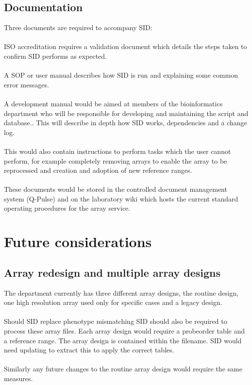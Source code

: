 \subsection{Documentation}
Three documents are required to accompany SID:
\paragraph*{}
ISO accreditation requires a validation document which details the steps taken to confirm SID performs as expected.
\paragraph*{}
A SOP or user manual describes how SID is run and explaining some common error messages.
\paragraph*{}
A development manual would be aimed at members of the bioinformatics department who will be responsible for developing and maintaining the script and database.. This will describe in depth how SID works, dependencies and a change log. 
\paragraph*{}
This would also contain instructions to perform tasks which the user cannot perform, for example completely removing arrays to enable the array to be reprocessed and creation and adoption of new reference ranges.
\paragraph*{}
These documents would be stored in the controlled document management system (Q-Pulse) and on the laboratory wiki which hosts the current standard operating procedures for the array service.

\section{Future considerations}
\subsection{Array redesign and multiple array designs}
The department currently has three different array designs, the routine design, one high resolution array used only for specific cases and a legacy design. 
\paragraph*{}
Should SID replace phenotype mismatching SID should also be required to process these array files. Each array design would require a probeorder table and a reference range. The array design is contained within the filename. SID would need updating to extract this to apply the correct tables.
\paragraph*{}
Similarly any future changes to the routine array design would require the same measures.